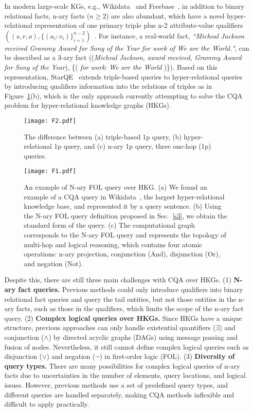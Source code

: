 \documentclass[letterpaper]{article} \usepackage{aaai23}  \usepackage{times}  \usepackage{helvet}  \usepackage{courier}  \usepackage[hyphens]{url}  \usepackage{graphicx} \urlstyle{rm} \def\UrlFont{\rm}  \usepackage{natbib}  \usepackage{caption} \frenchspacing  \setlength{\pdfpagewidth}{8.5in}  \setlength{\pdfpageheight}{11in}  \usepackage{algorithm}
\begin{document}
In modern large-scale KGs, e.g., Wikidata~\citep{Wikidata} and Freebase~\citep{Freebase}, in addition to binary relational facts, n-ary facts ($n\geq2$) are also abundant, which have a novel hyper-relational representation of one primary triple plus n-2 attribute-value qualifiers $((s,r,o),\{(a_i:v_i)\}^{n-2}_{i=1})$~\citep{HINGE}. For instance, a real-world fact, \textit{``Micheal Jackson received Grammy Award for Song of the Year for work of We are the World."}, can be described as a 3-ary fact ((\textit{Micheal Jackson, award received, Grammy Award for Song of the Year}), \{( \textit{for work}: \textit{We are the World} )\}). Based on this representation, StarQE~\citep{StarQE} extends triple-based queries to hyper-relational queries by introducing qualifiers information into the relations of triples as in Figure~\ref{f2}(b), which is the only approach currently attempting to solve the CQA problem for hyper-relational knowledge graphs (HKGs).

\begin{figure}[t]
\centering
\texttt{[image: F2.pdf]}
\caption{The difference between (a) triple-based 1p query, (b) hyper-relational 1p query, and (c) n-ary 1p query, three one-hop (1p) queries.}
\label{f2}
\end{figure}

\begin{figure*}[h!t]
\centering
\texttt{[image: F1.pdf]}
\caption{An example of N-ary FOL query over HKG. (a) We found an example of a CQA query in Wikidata~\citep{Wikidata}, the largest hyper-relational knowledge base, and represented it by a query sentence. (b) Using the N-ary FOL query definition proposed in Sec.~\ref{s3}, we obtain the standard form of the query. (c) The computational graph corresponds to the N-ary FOL query and represents the topology of multi-hop and logical reasoning, which contains four atomic operations: n-ary projection, conjunction (And), disjunction (Or), and negation (Not).}
\label{f1}
\end{figure*}

Despite this, there are still three main challenges with CQA over HKGs. (1) \textbf{N-ary fact queries.} Previous methods could only introduce qualifiers into binary relational fact queries and query the tail entities, but not those entities in the n-ary facts, such as those in the qualifiers, which limits the scope of the n-ary fact query. (2) \textbf{Complex logical queries over HKGs.} Since HKGs have a unique structure, previous approaches can only handle existential quantifiers ($\exists$) and conjunction ($\wedge$) by directed acyclic graphs (DAGs) using message passing and fusion of nodes. Nevertheless, it still cannot define complex logical queries such as disjunction ($\vee$) and negation ($\neg$) in first-order logic (FOL). (3) \textbf {Diversity of query types.} There are many possibilities for complex logical queries of n-ary facts due to uncertainties in the number of elements, query locations, and logical issues. However, previous methods use a set of predefined query types, and different queries are handled separately, making CQA methods inflexible and difficult to apply practically.
\end{document}
